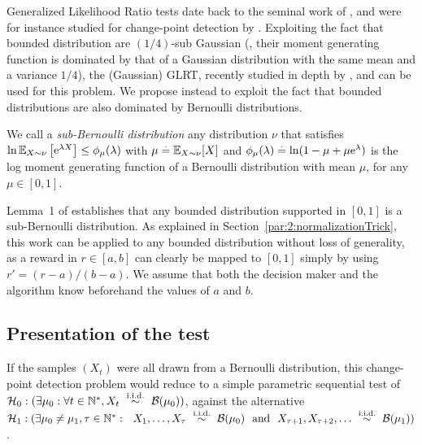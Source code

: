 Generalized Likelihood Ratio tests date back to the seminal work of \cite{Wilks1938}, and were for instance studied for change-point detection by \cite{barnard1959control,siegmund1995using}.
Exploiting the fact that bounded distribution are $(1/4)$-sub Gaussian (\ie, their moment generating function is dominated by that of a Gaussian distribution with the same mean and a variance $1/4$), the (Gaussian) GLRT, recently studied in depth by \cite{Maillard2018GLR}, and can be used for this problem.
We propose instead to exploit the fact that bounded distributions are also dominated by Bernoulli distributions.

\begin{definition}\label{def:6:subBernoulliDistributions}
\begin{leftbar}[defnbar]  %
    We call a \emph{sub-Bernoulli distribution} any distribution $\nu$ that satisfies
    $\ln \mathbb{E}_{X\sim\nu}\left[\mathrm{e}^{\lambda X}\right] \leq \phi_{\mu}(\lambda)$ with $\mu \overset{.}{=} \mathbb{E}_{X\sim \nu}[X]$ and $\phi_{\mu}(\lambda) \overset{.}{=} \ln(1-\mu + \mu \mathrm{e}^\lambda)$ is the log moment generating function of a Bernoulli distribution with mean $\mu$, for any $\mu\in[0,1]$.
\end{leftbar}  %
\end{definition}

Lemma~1 of \cite{KLUCBJournal} establishes that any bounded distribution supported in $[0,1]$ is a sub-Bernoulli distribution.
As explained in Section~\ref{par:2:normalizationTrick}, this work can be applied to any bounded distribution without loss of generality, as a reward in $r\in[a,b]$ can clearly be mapped to $[0,1]$ simply by using $r' = (r-a)/(b-a)$. We assume that both the decision maker and the algorithm know beforehand the values of $a$ and $b$.


\subsection{Presentation of the test}\label{sub:6:presentationOfGLRTest}

If the samples $(X_t)$ were all drawn from a Bernoulli distribution, this change-point detection problem would reduce to a simple parametric sequential test of
$\mathcal{H}_0 : (\exists \mu_0: \forall t\in\mathbb{N}^*, X_t \ \overset{\text{i.i.d.}}{\sim} \ \mathcal{B}(\mu_0))$,
against the alternative
$\cH_1 : (\exists \mu_0 \neq \mu_1, \tau \in \N^*: \ \  X_1, \dots, X_\tau \ \overset{\text{i.i.d.}}{\sim} \ \cB(\mu_0) \ \ \text{and} \ \ X_{\tau+1}, X_{\tau+2}, \dots \ \overset{\text{i.i.d.}}{\sim} \ \cB(\mu_1))$.

